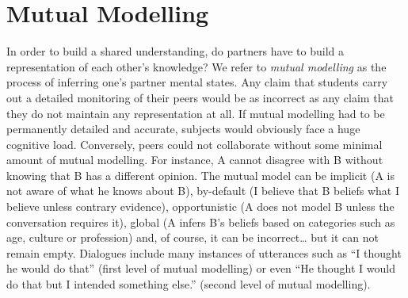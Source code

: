 \documentclass[twocolumn]{article}
\begin{document}
%
%
%

\section{Mutual Modelling}


In order to build a shared understanding, do partners have to build a
representation of each other's knowledge? We refer to \emph{mutual modelling} as
the process of inferring one's partner mental states. Any claim that students
carry out a detailed monitoring of their peers would be as incorrect as any
claim that they do not maintain any representation at all. If mutual modelling
had to be permanently detailed and accurate, subjects would obviously face a
huge cognitive load. Conversely, peers could not collaborate without some
minimal amount of mutual modelling. For instance, A cannot disagree with B
without knowing that B has a different opinion. The mutual model can be implicit
(A is not aware of what he knows about B), by-default (I believe that B beliefs
what I believe unless contrary evidence), opportunistic (A does not model B
unless the conversation requires it), global (A infers B's beliefs based on
categories such as age, culture or profession) and, of course, it can be
incorrect… but it can not remain empty. Dialogues include many instances of
utterances such as ``I thought he would do that'' (first level of mutual
modelling) or even ``He thought I would do that but I intended something else.''
(second level of mutual modelling).
\end{document}
